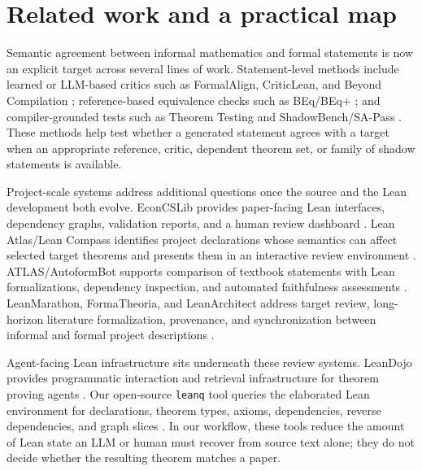 \section{Related work and a practical map}
\label{sec:related}

Semantic agreement between informal mathematics and formal statements is now an
explicit target across several lines of work.  Statement-level methods include
learned or LLM-based critics such as FormalAlign, CriticLean, and Beyond
Compilation \citep{lu2025formalalign,peng2025criticlean,zhang2026beyondcompilation};
reference-based equivalence checks such as BEq/BEq+
\citep{liu2025beq,poiroux2025reliable}; and compiler-grounded tests such as
Theorem Testing and ShadowBench/SA-Pass
\citep{kim2026theoremtesting,han2026shadowbench}.  These methods help test
whether a generated statement agrees with a target when an appropriate
reference, critic, dependent theorem set, or family of shadow statements is
available.

Project-scale systems address additional questions once the source and the Lean
development both evolve.  EconCSLib provides paper-facing Lean interfaces,
dependency graphs, validation reports, and a human review dashboard
\citep{garg2026econcs}.  Lean Atlas/Lean Compass identifies project declarations
whose semantics can affect selected target theorems and presents them in an
interactive review environment \citep{yanahama2026leanatlas}.  ATLAS/AutoformBot
supports comparison of textbook statements with Lean formalizations, dependency
inspection, and automated faithfulness assessments \citep{rammal2026scale}.
LeanMarathon, FormaTheoria, and LeanArchitect address target review,
long-horizon literature formalization, provenance, and synchronization between
informal and formal project descriptions
\citep{zhang2026leanmarathon,nie2026formatheoria,zhu2026leanarchitect}.

Agent-facing Lean infrastructure sits underneath these review systems.  LeanDojo
provides programmatic interaction and retrieval infrastructure for theorem
proving agents \citep{yang2023leandojo}.  Our open-source \texttt{leanq} tool
queries the elaborated Lean environment for declarations, theorem types, axioms,
dependencies, reverse dependencies, and graph slices
\citep{aiqlean2026tools}.  In our workflow, these tools reduce the amount of Lean
state an LLM or human must recover from source text alone; they do not decide
whether the resulting theorem matches a paper.

